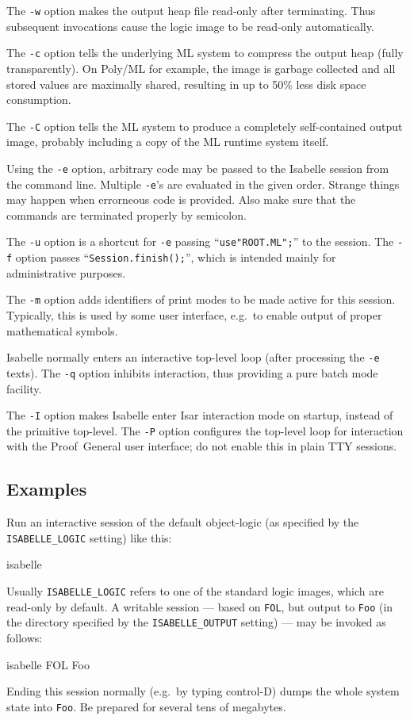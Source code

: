 \medskip The \texttt{-w} option makes the output heap file read-only after
terminating.  Thus subsequent invocations cause the logic image to be
read-only automatically.

\medskip The \texttt{-c} option tells the underlying ML system to compress the
output heap (fully transparently).  On Poly/ML for example, the image is
garbage collected and all stored values are maximally shared, resulting in up
to 50\% less disk space consumption.

\medskip The \texttt{-C} option tells the ML system to produce a completely
self-contained output image, probably including a copy of the ML runtime
system itself.

\medskip Using the \texttt{-e} option, arbitrary {\ML} code may be passed to
the Isabelle session from the command line. Multiple \texttt{-e}'s are
evaluated in the given order. Strange things may happen when errorneous {\ML}
code is provided. Also make sure that the {\ML} commands are terminated
properly by semicolon.

\medskip The \texttt{-u} option is a shortcut for \texttt{-e} passing
``\texttt{use"ROOT.ML";}'' to the {\ML} session.  The \texttt{-f} option
passes ``\texttt{Session.finish();}'', which is intended mainly for
administrative purposes.

\medskip The \texttt{-m} option adds identifiers of print modes to be made
active for this session. Typically, this is used by some user interface, e.g.\ 
to enable output of proper mathematical symbols.

\medskip Isabelle normally enters an interactive top-level loop (after
processing the \texttt{-e} texts). The \texttt{-q} option inhibits
interaction, thus providing a pure batch mode facility.

\medskip The \texttt{-I} option makes Isabelle enter Isar interaction mode on
startup, instead of the primitive {\ML} top-level.  The \texttt{-P} option
configures the top-level loop for interaction with the Proof~General user
interface; do not enable this in plain TTY sessions.


\subsection*{Examples}

Run an interactive session of the default object-logic (as specified
by the \texttt{ISABELLE_LOGIC} setting) like this:
\begin{ttbox}
isabelle
\end{ttbox}
Usually \texttt{ISABELLE_LOGIC} refers to one of the standard logic
images, which are read-only by default.  A writable session --- based
on \texttt{FOL}, but output to \texttt{Foo} (in the directory
specified by the \texttt{ISABELLE_OUTPUT} setting) --- may be invoked
as follows:
\begin{ttbox}
isabelle FOL Foo
\end{ttbox}
Ending this session normally (e.g.\ by typing control-D) dumps the whole {\ML}
system state into \texttt{Foo}. Be prepared for several tens of megabytes.

